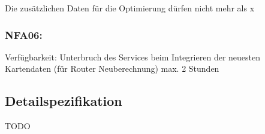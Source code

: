 Die zusätzlichen Daten für die Optimierung dürfen nicht mehr als x%

\subsubsection{NFA06: }
\label{NFA:NFA06}

Verfügbarkeit: Unterbruch des Services beim Integrieren der neuesten Kartendaten (für Router Neuberechnung) max. 2 Stunden

\subsection{Detailspezifikation}
\label{sub:Detailspezifikation}

TODO